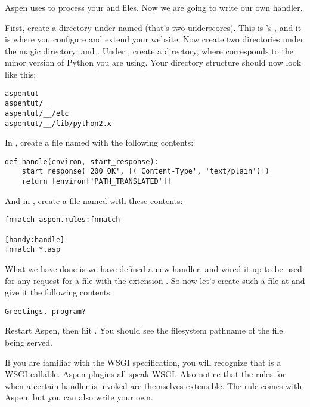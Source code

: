 Aspen uses  to process your  and 
files. Now we are going to write our own handler.

First, create a directory under  named \file{__} (that's two
underscores). This is 's , and it is where
you configure and extend your website. Now create two directories under the
magic directory:  and . Under , create a
 directory, where  corresponds to the minor version of
Python you are using. Your directory structure should now look like this:

\begin{verbatim}
aspentut
aspentut/__
aspentut/__/etc
aspentut/__/lib/python2.x
\end{verbatim}

In , create a file named  with the
following contents:

\begin{verbatim}
def handle(environ, start_response):
    start_response('200 OK', [('Content-Type', 'text/plain')])
    return [environ['PATH_TRANSLATED']]
\end{verbatim}

And in , create a file named  with these
contents:

\begin{verbatim}
fnmatch aspen.rules:fnmatch

[handy:handle]
fnmatch *.asp
\end{verbatim}

What we have done is we have defined a new handler, and wired it up to be used
for any request for a file with the extension . So now let's create
such a file at  and give it the following contents:

\begin{verbatim}
Greetings, program?
\end{verbatim}

Restart Aspen, then hit . You should see
the filesystem pathname of the file being served.

If you are familiar with the WSGI specification, you will recognize that
 is a WSGI callable. Aspen plugins all speak WSGI. Also
notice that the rules for when a certain handler is invoked are themselves
extensible. The  rule comes with Aspen, but you can also write
your own.


